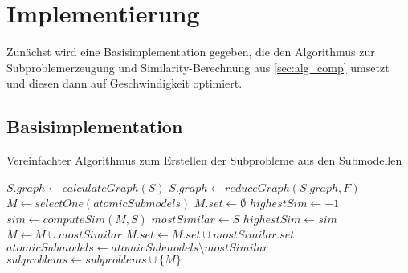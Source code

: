 \chapter{Implementierung} 

Zunächst wird eine Basisimplementation gegeben, die den Algorithmus zur Subproblemerzeugung und Similarity-Berechnung aus \autoref{sec:alg_comp} umsetzt und diesen dann auf Geschwindigkeit optimiert.

\section{Basisimplementation}

\begin{algorithm}
	\caption{Vereinfachter Algorithmus zum Erstellen der Subprobleme aus den Submodellen}\label{lst:create_sub}
	\begin{algorithmic}[1]
				\State $S.graph \gets calculateGraph(S)$
				\State $S.graph \gets reduceGraph(S.graph, F)$
			\EndFor {}
			 
				\State $M \gets selectOne(atomicSubmodels)$
				\State $M.set \gets \emptyset$
					\State $highestSim \gets -1$					
						\State $sim \gets computeSim(M, S)$
							\State $mostSimilar \gets S$
							\State $highestSim \gets sim$
						\EndIf
					\EndFor
					\State $M \gets M \cup mostSimilar$
					\State $M.set \gets M.set \cup mostSimilar.set$
					\State $atomicSubmodels \gets atomicSubmodels \setminus mostSimilar$
				\EndWhile
				\State $subproblems \gets subproblems \cup \{M\}$
			\EndWhile		
		\EndProcedure
	\end{algorithmic}
\end{algorithm}

